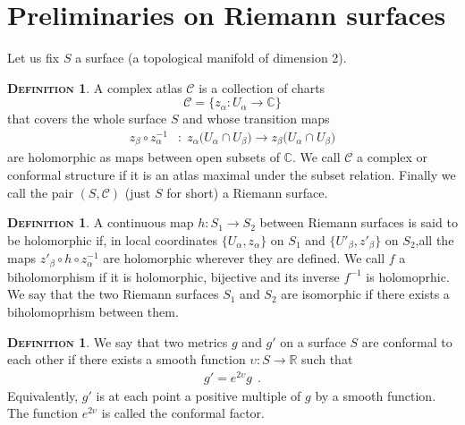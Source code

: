 \documentclass[a4paper,11pt,openright,twoside]{book}
\newcommand{\R}{\mathbb{R}}
\newcommand{\C}{\mathbb{C}}
\newcommand{\1}{\mathds{1}}
\theoremstyle{plain}
\theoremstyle{definition}
\newtheorem{defn}[thm]{\textsc{Definition}}
\theoremstyle{remark}
\begin{document}
\section{Preliminaries on Riemann surfaces}

Let us fix $S$ a surface (a topological manifold of dimension 2).
\begin{defn}
	A complex atlas $\mathcal{C}$ is a collection of charts 
	 \[\mathcal{C} = \{z_{\alpha}: U_{\alpha} \to  \C \} \] 
	 that covers the whole surface $S$ and whose transition maps
	\begin{align*}
	z_{\beta}\circ z_{\alpha}^{-1} &: \; z_{\alpha}\big(U_{\alpha}\cap U_{\beta}\big) \to z_{\beta}\big(U_{\alpha}\cap U_{\beta}\big)
	\end{align*}
	 are holomorphic as maps between open subsets of $\C$. We call $\mathscr{C}$ a complex or conformal structure if it is an atlas maximal under the subset relation. Finally we call the pair $(S,\mathscr{C})$ (just $S$ for short) a Riemann surface.
\end{defn}
\begin{defn}
	A continuous map $h: S_1 \to S_2$ between Riemann surfaces is said to be holomorphic if, in local coordinates  $\{U_\alpha,z_\alpha\}$ on $S_1$ and $\{U'_\beta,z'_\beta\}$ on $S_2$,all the maps $z'_\beta\circ h\circ z_\alpha^{-1}$ are holomorphic wherever they are defined.
	We call $f$ a biholomorphism if it is holomorphic, bijective and its inverse  $f^{-1}$ is holomoprhic.\\
	We say that the two Riemann surfaces $S_1$ and $S_2$ are isomorphic if there exists a biholomoprhism between them.
\end{defn}

\begin{defn}
	We say that two metrics $g$ and $g'$ on a surface $S$ are conformal to each other if there exists a smooth function $\upsilon:S\to \R$ such that
	\begin{align*}
		g' = e^{2\upsilon} g
		\ \ .
	\end{align*}
	Equivalently, $g'$ is at each point a positive multiple of $g$ by a smooth function. The function $e^{2\upsilon}$ is called the conformal factor.
\end{defn}
\end{document}
